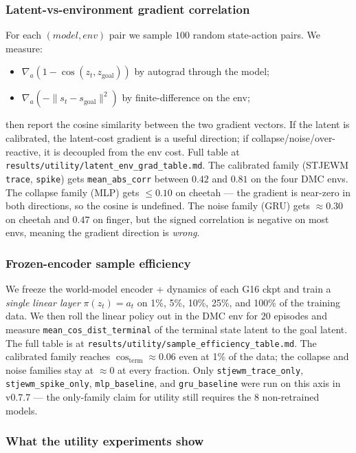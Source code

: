 \documentclass{article}
\begin{document}
\subsubsection{Latent-vs-environment gradient correlation}

For each $(model, env)$ pair we sample $100$ random state-action
pairs. We measure:
\begin{itemize}
\item $\nabla_a (1 - \cos(z_t, z_{\text{goal}}))$ by autograd through the
model;
\item $\nabla_a (-\|s_t - s_{\text{goal}}\|^2)$ by finite-difference on the
env;
\end{itemize}
then report the cosine similarity between the two gradient vectors.
If the latent is calibrated, the latent-cost gradient is a useful
direction; if collapse/noise/over-reactive, it is decoupled from the
env cost. Full table at
\texttt{results/utility/latent\_env\_grad\_table.md}. The calibrated family
(STJEWM \texttt{trace}, \texttt{spike}) gets \texttt{mean\_abs\_corr} between $0.42$ and
$0.81$ on the four DMC envs. The collapse family (MLP) gets
$\le 0.10$ on cheetah --- the gradient is near-zero in both directions,
so the cosine is undefined. The noise family (GRU) gets
$\approx 0.30$ on cheetah and $0.47$ on finger, but the signed
correlation is negative on most envs, meaning the gradient direction
is \emph{wrong}.

\subsubsection{Frozen-encoder sample efficiency}

We freeze the world-model encoder + dynamics of each G16 ckpt and
train a \emph{single linear layer} $\pi(z_t) = a_t$ on 1\%, 5\%, 10\%, 25\%,
and 100\% of the training data. We then roll the linear policy out in
the DMC env for $20$ episodes and measure
\texttt{mean\_cos\_dist\_terminal} of the terminal state latent to the goal
latent. The full table is at
\texttt{results/utility/sample\_efficiency\_table.md}. The calibrated family
reaches $\cos_{\text{term}} \approx 0.06$ even at 1\% of the data;
the collapse and noise families stay at $\approx 0$ at every fraction.
Only \texttt{stjewm\_trace\_only}, \texttt{stjewm\_spike\_only}, \texttt{mlp\_baseline}, and
\texttt{gru\_baseline} were run on this axis in v0.7.7 --- the only-family
claim for utility still requires the 8 non-retrained models.

\subsubsection{What the utility experiments show}
\end{document}
